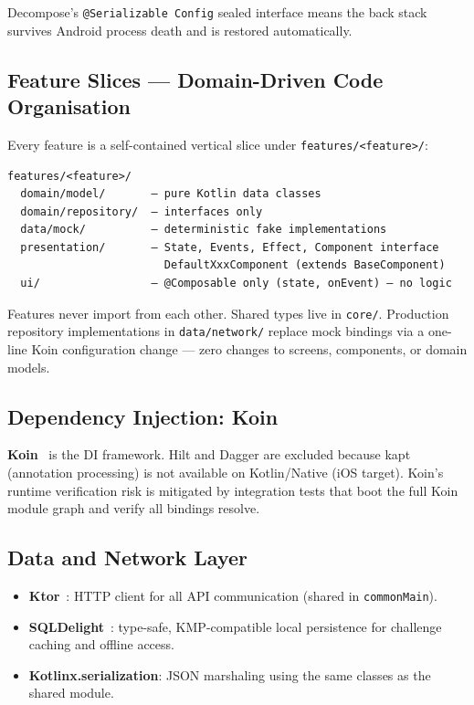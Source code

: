 Decompose's \texttt{@Serializable Config} sealed interface means the back stack survives Android process death and is restored automatically.

\subsection{Feature Slices — Domain-Driven Code Organisation}
\label{sec:feature_slices}

Every feature is a self-contained vertical slice under \texttt{features/<feature>/}:

\begin{verbatim}
features/<feature>/
  domain/model/       — pure Kotlin data classes
  domain/repository/  — interfaces only
  data/mock/          — deterministic fake implementations
  presentation/       — State, Events, Effect, Component interface
                        DefaultXxxComponent (extends BaseComponent)
  ui/                 — @Composable only (state, onEvent) — no logic
\end{verbatim}

Features never import from each other. Shared types live in \texttt{core/}. Production repository implementations in \texttt{data/network/} replace mock bindings via a one-line Koin configuration change — zero changes to screens, components, or domain models.

\subsection{Dependency Injection: Koin}
\label{ssec:koin}

\textbf{Koin}~\cite{koin2024} is the DI framework. Hilt and Dagger are excluded because kapt (annotation processing) is not available on Kotlin/Native (iOS target). Koin's runtime verification risk is mitigated by integration tests that boot the full Koin module graph and verify all bindings resolve.

\subsection{Data and Network Layer}
\label{ssec:client_data}

\begin{itemize}
    \item \textbf{Ktor}~\cite{ktor2024}: HTTP client for all API communication (shared in \texttt{commonMain}).
    \item \textbf{SQLDelight}~\cite{sqldelight2024}: type-safe, KMP-compatible local persistence for challenge caching and offline access.
    \item \textbf{Kotlinx.serialization}: JSON marshaling using the same classes as the shared module.
\end{itemize}


